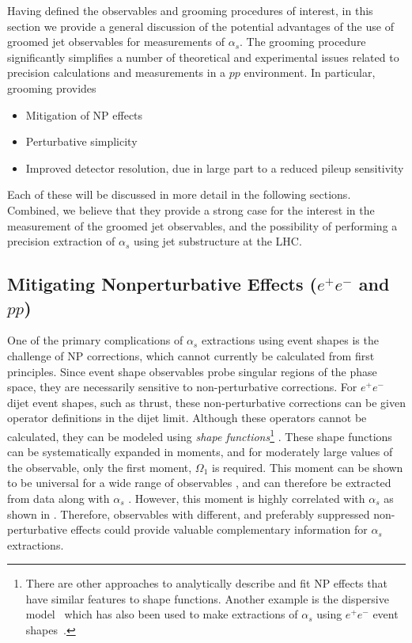 
Having defined the observables and grooming procedures of interest, in this section we provide a general discussion of the potential advantages of the use of groomed jet observables for measurements of $\alpha_s$. The grooming procedure significantly simplifies a number of theoretical and experimental issues related to precision calculations and measurements in a $pp$ environment. In particular, grooming provides
\begin{itemize}
\item Mitigation of NP effects
\item Perturbative simplicity
\item Improved detector resolution, due in large part to a reduced pileup sensitivity
\end{itemize}
Each of these will be discussed in more detail in the following
sections.  Combined, we believe that they provide a strong case for
the interest in the measurement of the groomed jet observables, and the possibility of performing a
precision extraction of $\alpha_s$ using jet substructure at the LHC.




\subsection{Mitigating Nonperturbative Effects ($e^+e^-$ and $pp$)}

One of the primary complications of $\alpha_s$ extractions using event
shapes is the challenge of NP corrections, which cannot
currently be calculated from first principles. Since event shape
observables probe singular regions of the phase space, they are
necessarily sensitive to non-perturbative corrections.  For $e^+e^-$
dijet event shapes, such as thrust, these non-perturbative corrections
can be given operator definitions in the dijet limit. Although these
operators cannot be calculated, they can be modeled using \textit{shape functions}\footnote{There are other approaches to analytically describe and fit NP effects that have similar features to shape functions.  Another example is the dispersive model~\cite{Dokshitzer:1995qm,Dokshitzer:1995zt} which has also been used to make extractions of $\alpha_s$ using $e^+e^-$ event shapes~\cite{Gehrmann:2012sc}.}
\cite{Korchemsky:1999kt,Korchemsky:2000kp,Hoang:2007vb,Ligeti:2008ac}. These
shape functions can be systematically expanded in moments, and for
moderately large values of the observable, only the first moment,
$\Omega_1$ is required. This moment can be shown to be universal for a
wide range of observables \cite{Lee:2006fn,Lee:2007jr}, and can
therefore be extracted from data along with $\alpha_s$
\cite{Abbate:2010xh,Abbate:2012jh,Hoang:2015hka}. However, this moment
is highly correlated with $\alpha_s$ as shown in . Therefore, observables with
different, and preferably suppressed non-perturbative effects could
provide valuable complementary information for $\alpha_s$ extractions.
%

